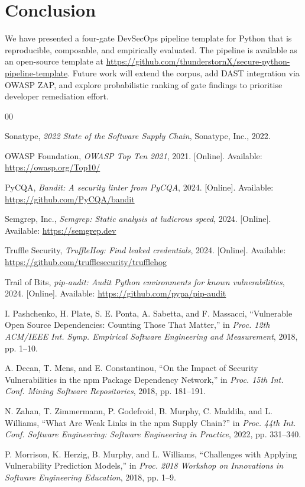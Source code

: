 \documentclass[conference]{IEEEtran}
\begin{document}
\section{Conclusion}

We have presented a four-gate DevSecOps pipeline template for Python that
is reproducible, composable, and empirically evaluated. The pipeline is
available as an open-source template at
\url{https://github.com/thunderstornX/secure-python-pipeline-template}.
Future work will extend the corpus, add DAST integration via OWASP ZAP,
and explore probabilistic ranking of gate findings to prioritise
developer remediation effort.

\begin{thebibliography}{00}

Sonatype, \textit{2022 State of the Software Supply Chain}, Sonatype, Inc., 2022.

OWASP Foundation, \textit{OWASP Top Ten 2021}, 2021.
[Online]. Available: \url{https://owasp.org/Top10/}

PyCQA, \textit{Bandit: A security linter from PyCQA}, 2024.
[Online]. Available: \url{https://github.com/PyCQA/bandit}

Semgrep, Inc., \textit{Semgrep: Static analysis at ludicrous speed}, 2024.
[Online]. Available: \url{https://semgrep.dev}

Truffle Security, \textit{TruffleHog: Find leaked credentials}, 2024.
[Online]. Available: \url{https://github.com/trufflesecurity/trufflehog}

Trail of Bits, \textit{pip-audit: Audit Python environments for known vulnerabilities}, 2024.
[Online]. Available: \url{https://github.com/pypa/pip-audit}

I. Pashchenko, H. Plate, S. E. Ponta, A. Sabetta, and F. Massacci,
``Vulnerable Open Source Dependencies: Counting Those That Matter,''
in \textit{Proc. 12th ACM/IEEE Int. Symp. Empirical Software Engineering and Measurement},
2018, pp. 1--10.

A. Decan, T. Mens, and E. Constantinou,
``On the Impact of Security Vulnerabilities in the npm Package Dependency Network,''
in \textit{Proc. 15th Int. Conf. Mining Software Repositories}, 2018, pp. 181--191.

N. Zahan, T. Zimmermann, P. Godefroid, B. Murphy, C. Maddila, and L. Williams,
``What Are Weak Links in the npm Supply Chain?''
in \textit{Proc. 44th Int. Conf. Software Engineering: Software Engineering in Practice},
2022, pp. 331--340.

P. Morrison, K. Herzig, B. Murphy, and L. Williams,
``Challenges with Applying Vulnerability Prediction Models,''
in \textit{Proc. 2018 Workshop on Innovations in Software Engineering Education},
2018, pp. 1--9.

\end{thebibliography}
\end{document}
